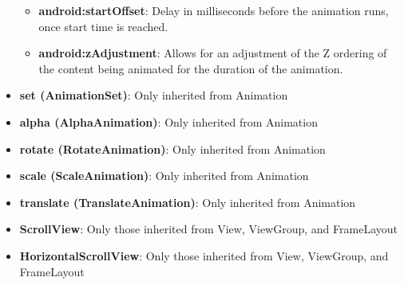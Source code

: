 \documentclass{report}
\begin{document}
\begin{itemize}
\begin{itemize}
                \item \textbf{android:startOffset}:	Delay in milliseconds before the animation runs, once start time is reached. 
                \item \textbf{android:zAdjustment}:	Allows for an adjustment of the Z ordering of the content being animated for the duration of the animation. 
            \end{itemize}
        \item \textbf{set (AnimationSet)}: Only inherited from Animation
        \item \textbf{alpha (AlphaAnimation)}: Only inherited from Animation
        \item \textbf{rotate (RotateAnimation)}: Only inherited from Animation
        \item \textbf{scale (ScaleAnimation)}: Only inherited from Animation
        \item \textbf{translate (TranslateAnimation)}: Only inherited from Animation
        \item \textbf{ScrollView}: Only those inherited from View, ViewGroup, and FrameLayout
        \item \textbf{HorizontalScrollView}: Only those inherited from View, ViewGroup, and FrameLayout
    \end{itemize}

    \pagebreak 
\end{document}

